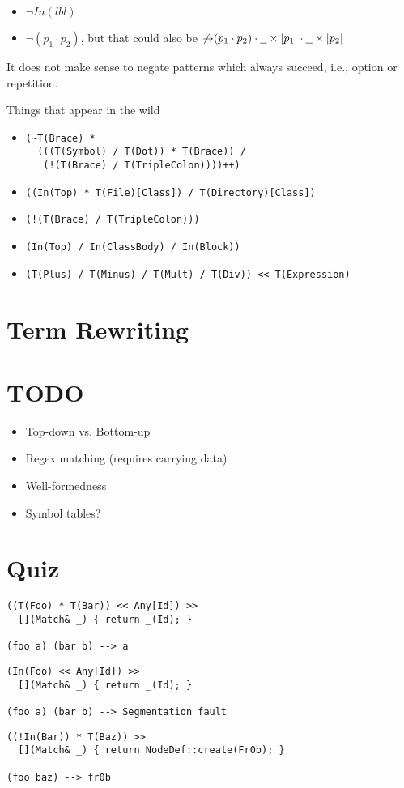 \documentclass{article}
\newcommand{\lbl}{\ensuremath{\mathit{lbl}}}
\newcommand{\pseq}[2]{\ensuremath{#1 \cdot #2}}
\newcommand{\any}{\ensuremath{\text{\underline{\hspace{0.6em}}}}}
\newcommand{\nfb}[1]{\ensuremath{\mathop{\not\rightarrow}(#1)}}
\newcommand{\pin}[1]{\ensuremath{\mathit{In}(#1)}}
\begin{document}
\begin{itemize}
\item $\lnot \pin{\lbl}$
\item $\lnot (\pseq{p_1}{p_2})$, but that could also be
  $\pseq{\nfb{\pseq{p_1}{p_2}}}{\pseq{\any\times|p_1|}{\any\times|p_2|}}$
\end{itemize}
%
It does not make sense to negate patterns which always succeed,
i.e., option or repetition.

Things that appear in the wild
\begin{itemize}
\item
\begin{verbatim}
(~T(Brace) *
  (((T(Symbol) / T(Dot)) * T(Brace)) /
   (!(T(Brace) / T(TripleColon))))++)
\end{verbatim}
\item \texttt{((In(Top) * T(File)[Class]) / T(Directory)[Class])}
\item \texttt{(!(T(Brace) / T(TripleColon)))}
\item \texttt{(In(Top) / In(ClassBody) / In(Block))}
\item
\begin{verbatim}
(T(Plus) / T(Minus) / T(Mult) / T(Div)) << T(Expression)
\end{verbatim}
\end{itemize}

\section{Term Rewriting}


\section*{TODO}

\begin{itemize}
\item Top-down vs. Bottom-up
\item Regex matching (requires carrying data)
\item Well-formedness
\item Symbol tables?
\end{itemize}

\section*{Quiz}

\begin{verbatim}
((T(Foo) * T(Bar)) << Any[Id]) >>
  [](Match& _) { return _(Id); }

(foo a) (bar b) --> a
\end{verbatim}

\begin{verbatim}
(In(Foo) << Any[Id]) >>
  [](Match& _) { return _(Id); }

(foo a) (bar b) --> Segmentation fault
\end{verbatim}

\begin{verbatim}
((!In(Bar)) * T(Baz)) >>
  [](Match& _) { return NodeDef::create(Fr0b); }

(foo baz) --> fr0b
\end{verbatim}
\end{document}
